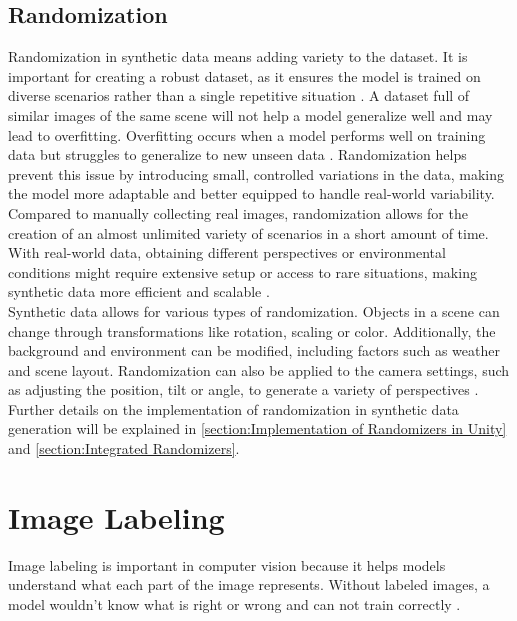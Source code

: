 \subsection{Randomization}
Randomization in synthetic data means adding variety to the dataset. It is important for creating a robust dataset, as it ensures the model is trained on diverse scenarios rather than a single repetitive situation \cite{borkman2021unityperceptiongeneratesynthetic}. A dataset full of similar images of the same scene will not help a model generalize well and may lead to overfitting. Overfitting occurs when a model performs well on training data but struggles to generalize to new unseen data \cite{Ying_2019}. Randomization helps prevent this issue by introducing small, controlled variations in the data, making the model more adaptable and better equipped to handle real-world variability.\\

\noindent Compared to manually collecting real images, randomization allows for the creation of an almost unlimited variety of scenarios in a short amount of time. With real-world data, obtaining different perspectives or environmental conditions might require extensive setup or access to rare situations, making synthetic data more efficient and scalable \cite{borkman2021unityperceptiongeneratesynthetic}. \\

\noindent Synthetic data allows for various types of randomization. Objects in a scene can change through transformations like rotation, scaling or color. Additionally, the background and environment can be modified, including factors such as weather and scene layout. Randomization can also be applied to the camera settings, such as adjusting the position, tilt or angle, to generate a variety of perspectives \cite{borkman2021unityperceptiongeneratesynthetic}.\\

\noindent Further details on the implementation of randomization in synthetic data generation will be explained in \ref{section:Implementation of Randomizers in Unity} and \ref{section:Integrated Randomizers}.


\section{Image Labeling}
Image labeling is important in computer vision because it helps models understand what each part of the image represents. Without labeled images, a model wouldn’t know what is right or wrong and can not train correctly \cite{Labelling}.\\

